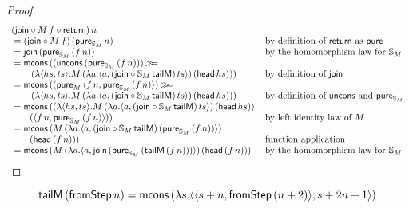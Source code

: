 \begin{proof}
$$
\begin{array}{ll}
(\join \comp  M\, f \comp \return)\, n \\
{}= (\join \comp  M\, f)\, (\apure_{\stream{M}}\, n)
  & \mbox{by definition of } \return \mbox{ as } \apure \\
{}= \join\, (\apure_{\stream{M}}\, (f \,n))
  & \mbox{by the homomorphism law for } \stream{M}\\
{}= \mcons\, ((\uncons\, (\apure_{\stream{M}}\, (f\, n)))\, \bind \\\qquad \,(\lambda \pair{hs}{ts} . M\,(\lambda a . \pair{a}{(\join \comp \stream{M}\,\mathsf{tailM})\, ts})\, (\head\, hs)))
  & \mbox{by definition of } \join \\
{}= \mcons\,((\apure_{M}\,\pair{f\, n}{\apure_{\stream{M}}\,(f\, n)})\, \bind \\\qquad \,(\lambda \pair{hs}{ts} . M\,(\lambda a . \pair{a}{(\join \comp \stream{M}\, \mathsf{tailM})\, ts})\, (\head\, hs)))
  & \mbox{by definition of } \uncons \mbox{ and } \apure_{\stream{M}} \\
{}= \mcons\, ((\lambda \pair{hs}{ts} . M\,(\lambda a . \pair{a}{(\join \comp \stream{M}\,\mathsf{tailM})\, ts})\, (\head\, hs)) \, \\\qquad (\pair{f\, n}{\apure_{\stream{M}}\,(f\, n)}))
  & \mbox{by left identity law of } M \\
{}= \mcons\,(M\,(\lambda a . \pair{a}{(\join \comp \stream{M}\,\mathsf{tailM})\, (\apure_{\stream{M}}\,(f\, n))})\, \\ \qquad (\head\, (f\, n)))
 & \mbox{function application} \\
 {}= \mcons\, (M\,(\lambda a . \pair{a}{\join\, (\apure_{\stream{M}}\, (\mathsf{tailM}\, (f\, n)))})\, (\head\, (f\, n)))
 & \mbox{by the homomorphism law for } \stream{M}\\

\end{array} 
$$
\end{proof}


\begin{lemma}\label{lemma:tailM_fromstepstr}
$$
\mathsf{tailM}\, (\mathsf{fromStep}\, n) = \mathsf{mcons}\, (\lambda s . \langle \langle s+n, \mathsf{fromStep}\, (n + 2) \rangle, s + 2n + 1 \rangle)
$$
\end{lemma} 

